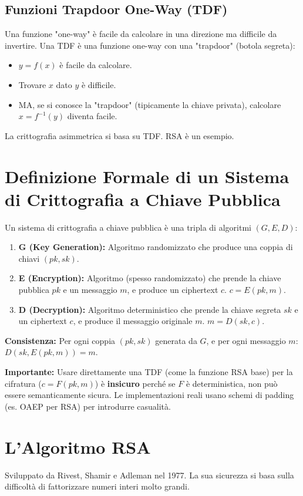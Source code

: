 \documentclass{article}
\begin{document}
\subsection{Funzioni Trapdoor One-Way (TDF)}
Una funzione "one-way" è facile da calcolare in una direzione ma difficile da invertire.
Una TDF è una funzione one-way con una "trapdoor" (botola segreta):
\begin{itemize}
    \item $y = f(x)$ è facile da calcolare.
    \item Trovare $x$ dato $y$ è difficile.
    \item MA, se si conosce la "trapdoor" (tipicamente la chiave privata), calcolare $x = f^{-1}(y)$ diventa facile.
\end{itemize}
La crittografia asimmetrica si basa su TDF. RSA è un esempio.

\section{Definizione Formale di un Sistema di Crittografia a Chiave Pubblica}
Un sistema di crittografia a chiave pubblica è una tripla di algoritmi $(G, E, D)$:
\begin{enumerate}[label=\arabic*.]
    \item \textbf{G (Key Generation):} Algoritmo randomizzato che produce una coppia di chiavi $(pk, sk)$.
    \item \textbf{E (Encryption):} Algoritmo (spesso randomizzato) che prende la chiave pubblica $pk$ e un messaggio $m$, e produce un ciphertext $c$. $c = E(pk, m)$.
    \item \textbf{D (Decryption):} Algoritmo deterministico che prende la chiave segreta $sk$ e un ciphertext $c$, e produce il messaggio originale $m$. $m = D(sk, c)$.
\end{enumerate}
\textbf{Consistenza:} Per ogni coppia $(pk, sk)$ generata da $G$, e per ogni messaggio $m$: $D(sk, E(pk, m)) = m$.

\textbf{Importante:} Usare direttamente una TDF (come la funzione RSA base) per la cifratura ($c = F(pk, m)$) è \textbf{insicuro} perché se $F$ è deterministica, non può essere semanticamente sicura. Le implementazioni reali usano schemi di padding (es. OAEP per RSA) per introdurre casualità.

\section{L'Algoritmo RSA}
Sviluppato da Rivest, Shamir e Adleman nel 1977. La sua sicurezza si basa sulla difficoltà di fattorizzare numeri interi molto grandi.
\end{document}
